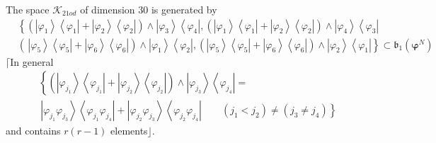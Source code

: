 \documentclass[aps,preprint]{revtex4}%
\begin{document}
The space $\mathcal{K}_{21od}$ of dimension $30$ is generated by
\begin{align}
&  \left\{  \left(  \left\vert \varphi_{1}\right\rangle \left\langle
\varphi_{1}\right\vert +\left\vert \varphi_{2}\right\rangle \left\langle
\varphi_{2}\right\vert \right)  \wedge\left\vert \varphi_{3}\right\rangle
\left\langle \varphi_{4}\right\vert ,\left(  \left\vert \varphi_{1}%
\right\rangle \left\langle \varphi_{1}\right\vert +\left\vert \varphi
_{2}\right\rangle \left\langle \varphi_{2}\right\vert \right)  \wedge
\left\vert \varphi_{4}\right\rangle \left\langle \varphi_{3}\right\vert
\right. \nonumber\\
&  \left.  \left(  \,\left\vert \varphi_{5}\right\rangle \left\langle
\varphi_{5}\right\vert +\left\vert \varphi_{6}\right\rangle \left\langle
\varphi_{6}\right\vert \right)  \wedge\left\vert \varphi_{1}\right\rangle
\left\langle \varphi_{2}\right\vert ,\left(  \left\vert \varphi_{5}%
\right\rangle \left\langle \varphi_{5}\right\vert +\left\vert \varphi
_{6}\right\rangle \left\langle \varphi_{6}\right\vert \right)  \wedge
\left\vert \varphi_{2}\right\rangle \left\langle \varphi_{1}\right\vert
\right\}  \subset\mathfrak{b}_{1}\left(  \mathbf{\varphi}^{N}\right)
\end{align}
$\mathbf{\lceil}$In general
\begin{align}
&  \left\{  \left(  \left\vert \varphi_{j_{1}}\right\rangle \left\langle
\varphi_{j_{1}}\right\vert +\left\vert \varphi_{j_{2}}\right\rangle
\left\langle \varphi_{j_{2}}\right\vert \right)  \wedge\left\vert
\varphi_{j_{3}}\right\rangle \left\langle \varphi_{j_{4}}\right\vert \right.
=\nonumber\\
&  \,\left\vert \varphi_{j_{1}}\varphi_{j_{3}}\right\rangle \left\langle
\varphi_{j_{1}}\varphi_{j_{4}}\right\vert +\left\vert \varphi_{j_{2}}%
\varphi_{j_{3}}\right\rangle \left\langle \varphi_{j_{2}}\varphi_{j_{4}%
}\right\vert \qquad\left.  \left(  j_{1}<j_{2}\right)  \neq\left(  j_{3}\neq
j_{4}\right)  \right\}
\end{align}
and contains $r\left(  r-1\right)  $ elements$\rfloor.$
\end{document}
